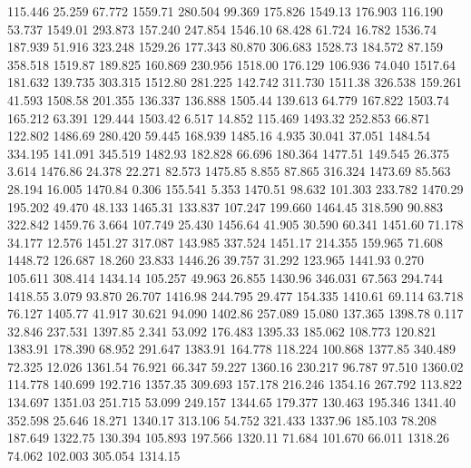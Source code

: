  115.446   25.259   67.772      1559.71
 280.504   99.369  175.826      1549.13
 176.903  116.190   53.737      1549.01
 293.873  157.240  247.854      1546.10
  68.428   61.724   16.782      1536.74
 187.939   51.916  323.248      1529.26
 177.343   80.870  306.683      1528.73
 184.572   87.159  358.518      1519.87
 189.825  160.869  230.956      1518.00
 176.129  106.936   74.040      1517.64
 181.632  139.735  303.315      1512.80
 281.225  142.742  311.730      1511.38
 326.538  159.261   41.593      1508.58
 201.355  136.337  136.888      1505.44
 139.613   64.779  167.822      1503.74
 165.212   63.391  129.444      1503.42
   6.517   14.852  115.469      1493.32
 252.853   66.871  122.802      1486.69
 280.420   59.445  168.939      1485.16
   4.935   30.041   37.051      1484.54
 334.195  141.091  345.519      1482.93
 182.828   66.696  180.364      1477.51
 149.545   26.375    3.614      1476.86
  24.378   22.271   82.573      1475.85
   8.855   87.865  316.324      1473.69
  85.563   28.194   16.005      1470.84
   0.306  155.541    5.353      1470.51
  98.632  101.303  233.782      1470.29
 195.202   49.470   48.133      1465.31
 133.837  107.247  199.660      1464.45
 318.590   90.883  322.842      1459.76
   3.664  107.749   25.430      1456.64
  41.905   30.590   60.341      1451.60
  71.178   34.177   12.576      1451.27
 317.087  143.985  337.524      1451.17
 214.355  159.965   71.608      1448.72
 126.687   18.260   23.833      1446.26
  39.757   31.292  123.965      1441.93
   0.270  105.611  308.414      1434.14
 105.257   49.963   26.855      1430.96
 346.031   67.563  294.744      1418.55
   3.079   93.870   26.707      1416.98
 244.795   29.477  154.335      1410.61
  69.114   63.718   76.127      1405.77
  41.917   30.621   94.090      1402.86
 257.089   15.080  137.365      1398.78
   0.117   32.846  237.531      1397.85
   2.341   53.092  176.483      1395.33
 185.062  108.773  120.821      1383.91
 178.390   68.952  291.647      1383.91
 164.778  118.224  100.868      1377.85
 340.489   72.325   12.026      1361.54
  76.921   66.347   59.227      1360.16
 230.217   96.787   97.510      1360.02
 114.778  140.699  192.716      1357.35
 309.693  157.178  216.246      1354.16
 267.792  113.822  134.697      1351.03
 251.715   53.099  249.157      1344.65
 179.377  130.463  195.346      1341.40
 352.598   25.646   18.271      1340.17
 313.106   54.752  321.433      1337.96
 185.103   78.208  187.649      1322.75
 130.394  105.893  197.566      1320.11
  71.684  101.670   66.011      1318.26
  74.062  102.003  305.054      1314.15
